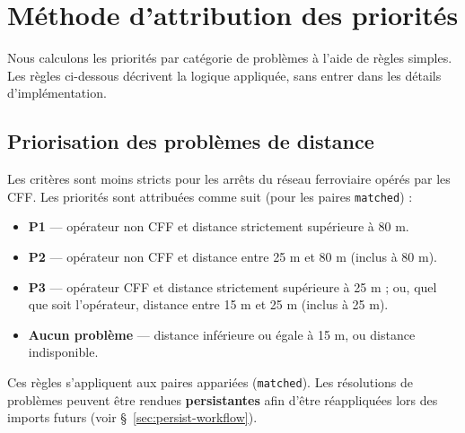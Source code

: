 \section{Méthode d'attribution des priorités}
Nous calculons les priorités par catégorie de problèmes à l'aide de règles simples. Les règles ci-dessous décrivent la logique appliquée, sans entrer dans les détails d'implémentation.

\subsection{Priorisation des problèmes de distance}
Les critères sont moins stricts pour les arrêts du réseau ferroviaire opérés par les CFF. Les priorités sont attribuées comme suit (pour les paires \texttt{matched}) :
\begin{itemize}
  \item \textbf{P1} — opérateur non CFF et distance strictement supérieure à 80 m.
  \item \textbf{P2} — opérateur non CFF et distance entre 25 m et 80 m (inclus à 80 m).
  \item \textbf{P3} — opérateur CFF et distance strictement supérieure à 25 m ; ou, quel que soit l'opérateur, distance entre 15 m et 25 m (inclus à 25 m).
  \item \textbf{Aucun problème} — distance inférieure ou égale à 15 m, ou distance indisponible.
\end{itemize}

\noindent Ces règles s'appliquent aux paires appariées (\texttt{matched}). Les résolutions de problèmes peuvent être rendues \textbf{persistantes} afin d'être réappliquées lors des imports futurs (voir \S~\ref{sec:persist-workflow}).

